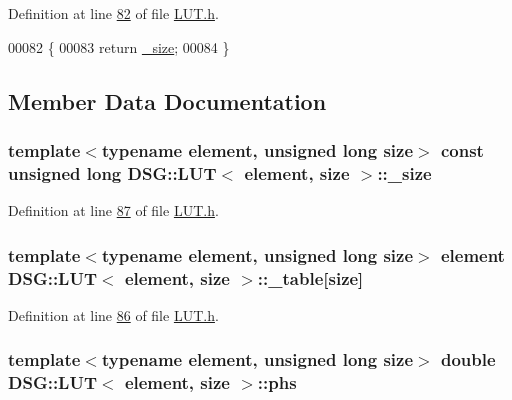 Definition at line \hyperlink{_l_u_t_8h_source_l00082}{82} of file \hyperlink{_l_u_t_8h_source}{L\+U\+T.\+h}.


\begin{DoxyCode}
00082                                         \{
00083             \textcolor{keywordflow}{return} \hyperlink{class_d_s_g_1_1_l_u_t_a87c352b5eaea2188955213c0f4ae9799}{\_size};
00084         \}
\end{DoxyCode}


\subsection{Member Data Documentation}
\hypertarget{class_d_s_g_1_1_l_u_t_a87c352b5eaea2188955213c0f4ae9799}{
\subsubsection[{\+\_\+size}]{\setlength{\rightskip}{0pt plus 5cm}template$<$typename element, unsigned long size$>$ const unsigned long {\bf D\+S\+G\+::\+L\+U\+T}$<$ element, size $>$\+::\+\_\+size\hspace{0.3cm}{\ttfamily [protected]}}}\label{class_d_s_g_1_1_l_u_t_a87c352b5eaea2188955213c0f4ae9799}


Definition at line \hyperlink{_l_u_t_8h_source_l00087}{87} of file \hyperlink{_l_u_t_8h_source}{L\+U\+T.\+h}.

\hypertarget{class_d_s_g_1_1_l_u_t_ac8b23bbb7ce259d4ceb1c6fa93a7f29f}{
\subsubsection[{\+\_\+table}]{\setlength{\rightskip}{0pt plus 5cm}template$<$typename element, unsigned long size$>$ element {\bf D\+S\+G\+::\+L\+U\+T}$<$ element, size $>$\+::\+\_\+table\mbox{[}size\mbox{]}\hspace{0.3cm}{\ttfamily [protected]}}}\label{class_d_s_g_1_1_l_u_t_ac8b23bbb7ce259d4ceb1c6fa93a7f29f}


Definition at line \hyperlink{_l_u_t_8h_source_l00086}{86} of file \hyperlink{_l_u_t_8h_source}{L\+U\+T.\+h}.

\hypertarget{class_d_s_g_1_1_l_u_t_a9ab8f8e89346c759e06f6d76c5b816cc}{
\subsubsection[{phs}]{\setlength{\rightskip}{0pt plus 5cm}template$<$typename element, unsigned long size$>$ double {\bf D\+S\+G\+::\+L\+U\+T}$<$ element, size $>$\+::phs\hspace{0.3cm}{\ttfamily [protected]}}}\label{class_d_s_g_1_1_l_u_t_a9ab8f8e89346c759e06f6d76c5b816cc}


